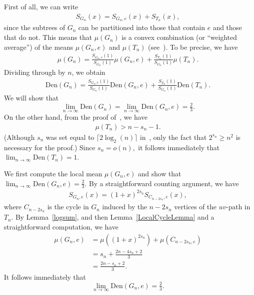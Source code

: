 \documentclass[12pt]{article}
\newcommand{\den}{\mbox{Den}}
\theoremstyle{definition}
\begin{document}
First of all, we can write
\begin{align}\label{ePartition}
S_{G_n}(x)=S_{G_n,e}(x)+S_{T_n}(x),
\end{align}
since the subtrees of $G_n$ can be partitioned into those that contain $e$ and those that do not.  This means that $\mu(G_n)$ is a convex combination (or ``weighted average'') of the means $\mu(G_n,e)$ and $\mu(T_n)$ (see~\cite[Lemma 3.8]{Jamison1983}).  To be precise, we have
\begin{align}\label{Weighted}
    \mu(G_n)=\frac{S_{G_n,e}(1)}{S_{G_n}(1)}\mu(G_n,e)+\frac{S_{T_n}(1)}{S_{G_n}(1)}\mu(T_n).
\end{align}
Dividing through by $n$, we obtain
\begin{align}\label{WeightedDensities}
    \den(G_n)=\frac{S_{G_n,e}(1)}{S_{G_n}(1)}\den(G_n,e)+\frac{S_{T_n}(1)}{S_{G_n}(1)}\den(T_n).
\end{align}
We will show that 
\[
\lim_{n\rightarrow\infty}\den(G_n)=\lim_{n\rightarrow\infty}\den(G_n,e)=\tfrac{2}{3}.
\]
On the other hand, from the proof of~\cite[Corollary 4.3]{MolOellermann2019}, we have
\begin{align}\label{MTn}
\mu(T_n)>n-s_n-1.
\end{align}
(Although $s_n$ was set equal to $\lceil 2\log_2(n)\rceil$ in~\cite{MolOellermann2019}, only the fact that $2^{s_n}\geq n^2$ is necessary for the proof.)
Since $s_n=o(n),$ it follows immediately that $\displaystyle\lim_{n\rightarrow\infty}\den(T_n)=1$.

We first compute the local mean $\mu(G_n,e)$ and show that $\displaystyle\lim_{n\rightarrow\infty}\den(G_n,e)=\tfrac{2}{3}$.  By a straightforward counting argument, we have
\begin{align}\label{LocalPoly}
S_{G_n,e}(x)=(1+x)^{2s_n}S_{C_{n-2s_n},e}(x),
\end{align}
where $C_{n-2s_n}$ is the cycle in $G_n$ induced by the $n-2s_n$ vertices of the $uv$-path in $T_n$.  By Lemma~\ref{logsum}, and then Lemma~\ref{LocalCycleLemma} and a straightforward computation, we have
\begin{align*}
\mu(G_n,e)&=\mu((1+x)^{2s_n})+\mu(C_{n-2s_n,e})\\
&=s_n+\frac{2n-4s_n+2}{3}\\
&=\frac{2n-s_n+2}{3}.
\end{align*}
It follows immediately that
\[
\lim_{n\rightarrow\infty}\den(G_n,e)=\tfrac{2}{3}.
\]
\end{document}
